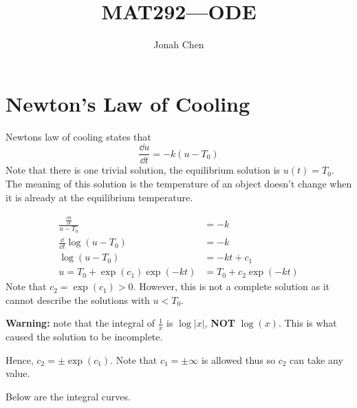 \documentclass[a4paper]{article}
\title{MAT292---ODE}
\author{Jonah Chen}
\numberwithin{equation}{section}
\begin{document}
\maketitle
\tableofcontents
\section{Newton's Law of Cooling}
Newtons law of cooling states that
\begin{equation}
    \frac{\dd u}{\dd t}=-k(u-T_0)
\end{equation}
Note that there is one trivial solution, the equilibrium solution is $u(t)=T_0$. The meaning of this solution is the temperature of an object doesn't change when it is already at the equilibrium temperature.

\begin{align}
    \frac{\frac{\dd u}{\dd t}}{u-T_0}&=-k\\
    \frac{\dd}{\dd t}\log(u-T_0)&=-k\\
    \log(u-T_0)&=-kt+c_1\\
    u=T_0+\exp(c_1)\exp(-kt)&=T_0+c_2\exp(-kt)
\end{align}
Note that $c_2=\exp(c_1)>0$. However, this is not a complete solution as it cannot describe the solutions with $u<T_0$.

\textbf{Warning:} note that the integral of $\frac{1}{x}$ is $\log|x|$, \textbf{NOT} $\log(x)$. This is what caused the solution to be incomplete.

Hence, $c_2=\pm\exp(c_1)$. Note that $c_1=\pm\infty$ is allowed thus so $c_2$ can take any value.

Below are the integral curves.
\end{document}
